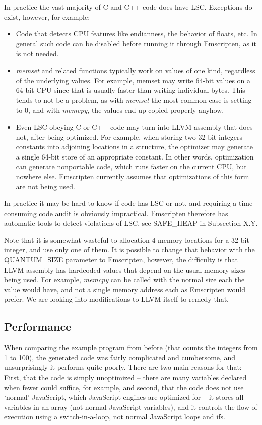 \documentclass[11pt]{proc}
\begin{document}
In practice the vast majority of C and C++ code does have LSC. Exceptions
do exist, however, for example:
\begin{itemize}
\item Code that detects CPU features like endianness, the behavior of floats, etc. In general such code can be disabled
      before running it through Emscripten, as it is not needed.
\item \emph{memset} and related functions typically work on values of one kind,
      regardless of the underlying values. For example, memset may write 64-bit
      values on a 64-bit CPU since that is usually faster than writing individual
      bytes. This tends to
      not be a problem, as with \emph{memset} the most common case is setting to
      0, and with \emph{memcpy}, the values end up copied properly anyhow.
\item Even LSC-obeying C or C++ code may turn into LLVM assembly that does not,
      after being optimized. For example, when storing two 32-bit integers constants into
      adjoining locations in a structure, the optimizer may generate a single
      64-bit store of an appropriate constant. In other words, optimization can
      generate nonportable code, which runs faster on the current CPU, but
      nowhere else. Emscripten currently assumes that optimizations of this form
      are not being used.
\end{itemize}
In practice it may be hard to know if code has LSC or not, and requiring
a time-consuming code audit is obviously impractical. Emscripten therefore has
automatic tools to detect violations of LSC, see SAFE\_HEAP in Subsection X.Y.

Note that it is somewhat wasteful to allocation 4 memory locations for
a 32-bit integer, and use only one of them. It is possible to change
that behavior with the QUANTUM\_SIZE parameter to Emscripten, however,
the difficulty is that LLVM assembly has hardcoded values that depend on
the usual memory sizes being used. For example, \emph{memcpy} can be
called with the normal size each the value would have, and not a single
memory address each as Emscripten would prefer. We are looking into modifications
to LLVM itself to remedy that.

\subsection{Performance}

When comparing the example program from before (that counts the
integers from 1 to 100), the generated code was fairly complicated
and cumbersome, and unsurprisingly it performs quite poorly. There
are two main reasons for that: First, that the code is simply
unoptimized -- there are many variables declared when fewer could
suffice, for example, and second, that the code does not use `normal'
JavaScript, which JavaScript engines are optimized for -- it
stores all variables in an array (not normal JavaScript variables),
and it controls the flow of execution using a switch-in-a-loop, not
normal JavaScript loops and ifs.
\end{document}
